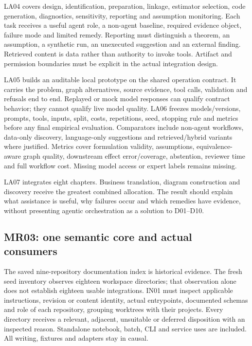 \documentclass[
  11pt,
  a4paper,
]{article}
\begin{document}
LA04 covers design, identification, preparation, linkage, estimator
selection, code generation, diagnostics, sensitivity, reporting and
assumption monitoring. Each task receives a useful agent role, a
non-agent baseline, required evidence object, failure mode and limited
remedy. Reporting must distinguish a theorem, an assumption, a synthetic
run, an unexecuted suggestion and an external finding. Retrieved content
is data rather than authority to invoke tools. Artifact and permission
boundaries must be explicit in the actual integration design.

LA05 builds an auditable local prototype on the shared operation
contract. It carries the problem, graph alternatives, source evidence,
tool calls, validation and refusals end to end. Replayed or mock model
responses can qualify contract behavior; they cannot qualify live model
quality. LA06 freezes models/versions, prompts, tools, inputs, split,
costs, repetitions, seed, stopping rule and metrics before any final
empirical evaluation. Comparators include non-agent workflows, data-only
discovery, language-only suggestions and retrieved/hybrid variants where
justified. Metrics cover formulation validity, assumptions, equivalence-
aware graph quality, downstream effect error/coverage, abstention,
reviewer time and full workflow cost. Missing model access or expert
labels remains missing.

LA07 integrates eight chapters. Business translation, diagram
construction and discovery receive the greatest combined allocation. The
result should explain what assistance is useful, why failures occur and
which remedies have evidence, without presenting agentic orchestration
as a solution to D01--D10.

\hypertarget{mr03-one-semantic-core-and-actual-consumers}{%
\subsection{MR03: one semantic core and actual
consumers}\label{mr03-one-semantic-core-and-actual-consumers}}

The saved nine-repository documentation index is historical evidence.
The fresh seed inventory observes eighteen workspace directories; that
observation alone does not establish eighteen usable integrations. IN01
must inspect applicable instructions, revision or content identity,
actual entrypoints, documented schemas and role of each repository,
grouping worktrees with their projects. Every directory receives a
relevant, adjacent, unsuitable or deferred disposition with an inspected
reason. Standalone notebook, batch, CLI and service uses are included.
All writing, fixtures and adapters stay in causal.
\end{document}
